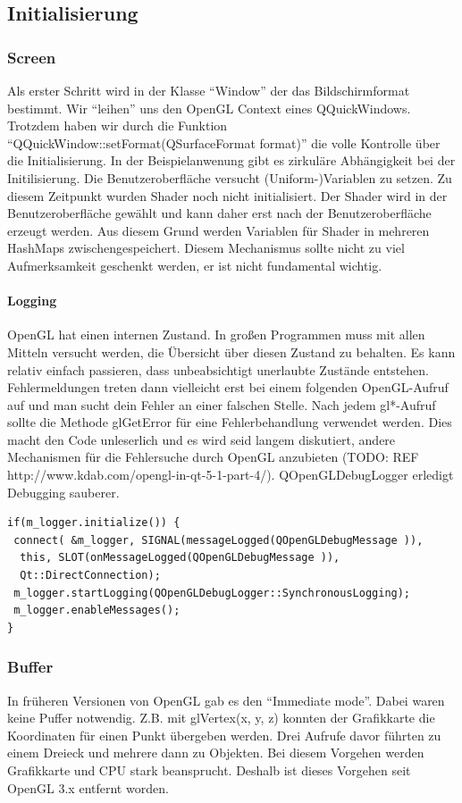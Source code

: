 \documentclass[a4paper,12pt]{article}
\begin{document}
\subsection{Initialisierung}
\subsubsection{Screen}
Als erster Schritt wird in der Klasse "`Window"' der das Bildschirmformat bestimmt. Wir "`leihen"' uns den OpenGL Context eines QQuickWindows. Trotzdem haben wir durch die Funktion "`QQuickWindow::setFormat(QSurfaceFormat format)"' die volle Kontrolle über die Initialisierung. 
In der Beispielanwenung gibt es zirkuläre Abhängigkeit bei der Initilisierung. Die Benutzeroberfläche versucht (Uniform-)Variablen zu setzen. Zu diesem Zeitpunkt wurden Shader noch nicht initialisiert. Der Shader wird in der Benutzeroberfläche gewählt und kann daher erst nach der Benutzeroberfläche erzeugt werden. Aus diesem Grund werden Variablen für Shader in mehreren HashMaps zwischengespeichert. Diesem Mechanismus sollte nicht zu viel Aufmerksamkeit geschenkt werden, er ist nicht fundamental wichtig.

\paragraph{Logging}
OpenGL hat einen internen Zustand. In großen Programmen muss mit allen Mitteln versucht werden, die Übersicht über diesen Zustand zu behalten. Es kann relativ einfach passieren, dass unbeabsichtigt unerlaubte Zustände entstehen. Fehlermeldungen treten dann vielleicht erst bei einem folgenden OpenGL-Aufruf auf und man sucht dein Fehler an einer falschen Stelle. Nach jedem gl*-Aufruf sollte die Methode glGetError für eine Fehlerbehandlung verwendet werden. Dies macht den Code unleserlich und es wird seid langem diskutiert, andere Mechanismen für die Fehlersuche durch OpenGL anzubieten (TODO: REF http://www.kdab.com/opengl-in-qt-5-1-part-4/).
QOpenGLDebugLogger erledigt Debugging sauberer.
\begin{lstlisting}[frame=single, columns=fullflexible]
if(m_logger.initialize()) {
 connect( &m_logger, SIGNAL(messageLogged(QOpenGLDebugMessage )),
  this, SLOT(onMessageLogged(QOpenGLDebugMessage )),
  Qt::DirectConnection);
 m_logger.startLogging(QOpenGLDebugLogger::SynchronousLogging);
 m_logger.enableMessages();
}
\end{lstlisting}
\subsubsection{Buffer}
In früheren Versionen von OpenGL gab es den "`Immediate mode"'. Dabei waren keine Puffer notwendig. Z.B. mit glVertex(x, y, z) konnten der Grafikkarte die Koordinaten für einen Punkt übergeben werden. Drei Aufrufe davor führten zu einem Dreieck und mehrere dann zu Objekten. Bei diesem Vorgehen werden Grafikkarte und CPU stark beansprucht. Deshalb ist dieses Vorgehen seit OpenGL 3.x entfernt worden.
\end{document}
